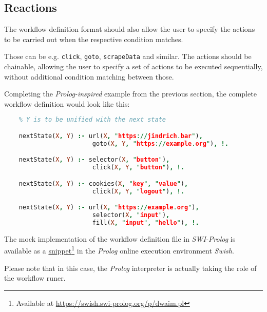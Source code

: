 \subsection{Reactions} \label{markov}

The workflow definition format should also allow the user to specify the actions to be carried out when the respective condition matches.

Those can be e.g. \texttt{click}, \texttt{goto}, \texttt{scrapeData} and similar. 
The actions should be chainable, allowing the user to specify a set of actions to be executed sequentially, without additional condition matching between those.

Completing the \textit{Prolog-inspired} example from the previous section, the complete workflow definition would look like this:

\begin{minipage}{0.95\linewidth}
\begin{lstlisting}[language=prolog, columns=spaceflexible]
    % X is denoting the current state of the browser
    % Y is to be unified with the next state

    nextState(X, Y) :- url(X, "https://jindrich.bar"),
                        goto(X, Y, "https://example.org"), !.

    nextState(X, Y) :- selector(X, "button"),
                        click(X, Y, "button"), !.

    nextState(X, Y) :- cookies(X, "key", "value"),
                        click(X, Y, "logout"), !.

    nextState(X, Y) :- url(X, "https://example.org"),
                        selector(X, "input"),
                        fill(X, "input", "hello"), !.

\end{lstlisting}
\end{minipage}

\emptyline

The mock implementation of the workflow definition file in \textit{SWI-Prolog} is available as a \href{https://swish.swi-prolog.org/p/dwaim.pl}{snippet}\footnote{Available at \url{https://swish.swi-prolog.org/p/dwaim.pl}} in the \textit{Prolog} online execution environment \textit{Swish}. 

Please note that in this case, the \textit{Prolog} interpreter is actually taking the role of the workflow runer.


